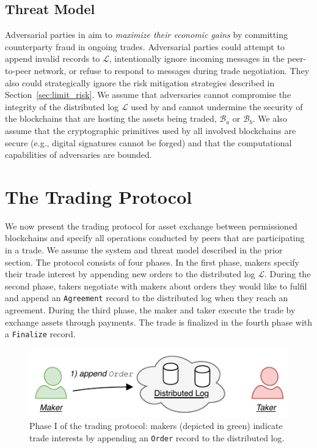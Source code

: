\subsection{Threat Model}
Adversarial parties in \ModelName{} aim to \emph{maximize their economic gains} by committing counterparty fraud in ongoing trades.
Adversarial parties could attempt to append invalid records to $ \mathcal{L} $, intentionally ignore incoming messages in the peer-to-peer network, or refuse to respond to messages during trade negotiation.
They also could strategically ignore the risk mitigation strategies described in Section~\ref{sec:limit_risk}.
We assume that adversaries cannot compromise the integrity of the distributed log $ \mathcal{L} $ used by \ModelName{} and cannot undermine the security of the blockchains that are hosting the assets being traded, $ \mathcal{B}_a $ or $ \mathcal{B}_b $.
We also assume that the cryptographic primitives used by all involved blockchains are secure (e.g., digital signatures cannot be forged) and that the computational capabilities of adversaries are bounded.

\section{The \ModelName{} Trading Protocol}
\label{sec:xchange_protocol}
We now present the \ModelName{} trading protocol for asset exchange between permissioned blockchains and specify all operations conducted by peers that are participating in a trade.
We assume the system and threat model described in the prior section.
The protocol consists of four phases.
In the first phase, makers specify their trade interest by appending new orders to the distributed log $ \mathcal{L} $.
During the second phase, takers negotiate with makers about orders they would like to fulfil and append an \texttt{Agreement} record to the distributed log when they reach an agreement.
During the third phase, the maker and taker execute the trade by exchange assets through payments.
The trade is finalized in the fourth phase with a \texttt{Finalize} record.

\begin{figure}[h]
	\centering
	\includegraphics[width=0.7\linewidth]{xchange/assets/xchange_protocol_1}
	\caption{Phase I of the \ModelName{} trading protocol: makers (depicted in green) indicate trade interests by appending an \texttt{Order} record to the distributed log.}
	\label{fig:xchange_protocol_1}
\end{figure}

